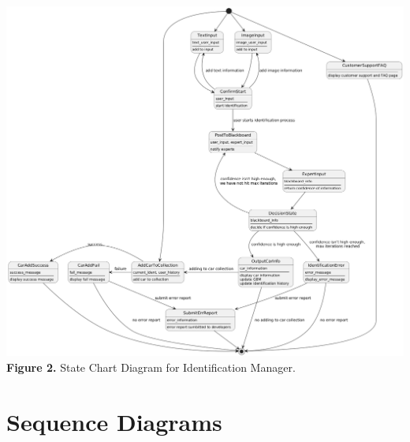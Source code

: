 \documentclass[]{article}
\begin{document}
\begin{center}
	\includegraphics[scale=0.38]{State Diagrams/IdentStateDiagramUML.png}\\ 
	\textbf{Figure 2.} State Chart Diagram for Identification Manager.\\
\end{center}


\section{Sequence Diagrams}
\label{sec:sequence_diagrams}
\end{document}

